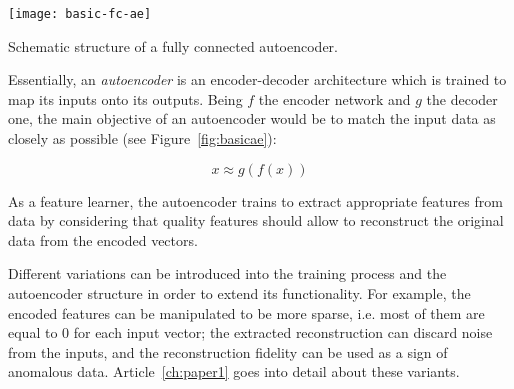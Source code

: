 \begin{marginfigure}
    \texttt{[image: basic-fc-ae]}
    \caption{\label{fig:basicae}Schematic structure of a fully connected autoencoder.}
\end{marginfigure}

Essentially, an \textit{autoencoder} is an encoder-decoder architecture which is trained to map its inputs onto its outputs. Being $f$ the encoder network and $g$ the decoder one, the main objective of an autoencoder would be to match the input data as closely as possible (see Figure~\ref{fig:basicae}):

\begin{equation}
    x\approx g(f(x))
\end{equation}

As a feature learner, the autoencoder trains to extract appropriate features from data by considering that quality features should allow to reconstruct the original data from the encoded vectors.

Different variations can be introduced into the training process and the autoencoder structure in order to extend its functionality. For example, the encoded features can be manipulated to be more sparse, i.e. most of them are equal to 0 for each input vector; the extracted reconstruction can discard noise from the inputs, and the reconstruction fidelity can be used as a sign of anomalous data. Article~\ref{ch:paper1} goes into detail about these variants.
